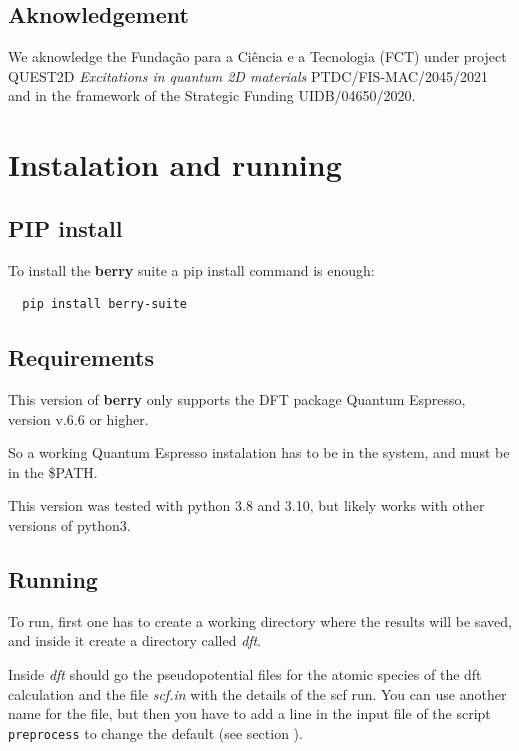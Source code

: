 \documentclass[a4paper,12pt]{report}
\begin{document}
\section{Aknowledgement}

We aknowledge the Fundação para a Ciência e a Tecnologia (FCT)
under project  QUEST2D \emph{Excitations in quantum 2D materials}
PTDC/FIS-MAC/2045/2021 and in the framework of the Strategic Funding UIDB/04650/2020.






\chapter{Instalation and running}

\section{PIP install}

To install the \textbf{berry} suite a pip install command is enough:
\begin{verbatim}
  pip install berry-suite
\end{verbatim}


\section{Requirements}

This version of \textbf{berry} only supports the DFT package {\sc Quantum Espresso}, version v.6.6 or higher.

So a working {\sc Quantum Espresso} instalation has to be in the system, and must be in the \$PATH.

This version was tested with python 3.8 and 3.10, but likely works with other versions of python3.


\section{Running}\label{sec:running}

 To run, first one has to create a working directory where the results will be saved,
 and inside it create a directory called \emph{dft}.

 Inside \emph{dft} should go the pseudopotential files for the atomic species of the dft calculation
and the file \emph{scf.in} with the details of the scf run.
You can use another name for the file, but then you have to add a line in the input file of
the script \texttt{preprocess} to change the default (see section ).
\end{document}
